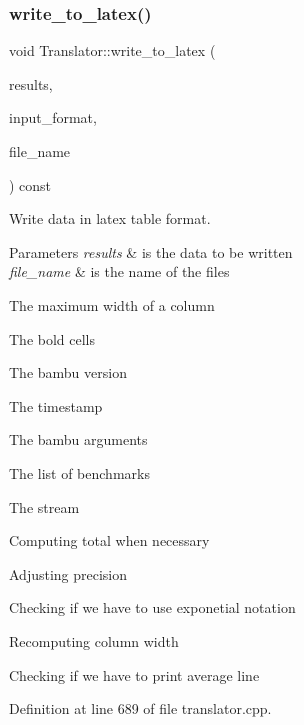\mbox{\label{classTranslator_a6194c4b18e48988d4785f172d58565aa}} 
\subsubsection{\texorpdfstring{write\+\_\+to\+\_\+latex()}{write\_to\_latex()}}
{\footnotesize\ttfamily void Translator\+::write\+\_\+to\+\_\+latex (\begin{DoxyParamCaption}\item[{std\+::map$<$ std\+::string, \hyperlink{custom__map_8hpp_a18ca01763abbe3e5623223bfe5aaac6b}{Custom\+Map}$<$ std\+::string, std\+::string $>$$>$ \&}]{results,  }\item[{const \hyperlink{Parameter_8hpp_a67fa05fdc413fd22ad4f96d04e4f99f1}{Parameters\+\_\+\+File\+Format}}]{input\+\_\+format,  }\item[{const std\+::string \&}]{file\+\_\+name }\end{DoxyParamCaption}) const}



Write data in latex table format. 


\begin{DoxyParams}{Parameters}
{\em results} & is the data to be written \\
\hline
{\em file\+\_\+name} & is the name of the files \\
\hline
\end{DoxyParams}
The maximum width of a column

The bold cells

The bambu version

The timestamp

The bambu arguments

The list of benchmarks

The stream

Computing total when necessary

Adjusting precision

Checking if we have to use exponetial notation

Recomputing column width

Checking if we have to print average line 

Definition at line 689 of file translator.\+cpp.



